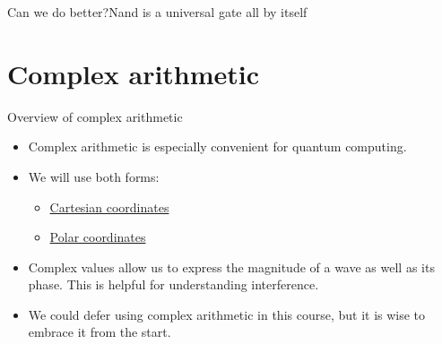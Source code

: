 \begin{frame}{Can we do better?}{Nand is a universal gate all by itself}

\end{frame}

\section{Complex arithmetic}

\begin{frame}{Overview of complex arithmetic}
\begin{itemize}
    \item Complex arithmetic is especially convenient for quantum computing.
    \item We will use both forms:
    \begin{itemize}
        \item \href{https://en.wikipedia.org/wiki/Cartesian_coordinate_system}{Cartesian coordinates}
        \item \href{https://en.wikipedia.org/wiki/Polar_coordinate_system}{Polar coordinates}
    \end{itemize}
    \item Complex values allow us to express the magnitude of a wave as well as its phase.  This is helpful for understanding interference.
    \item We could defer using complex arithmetic in this course, but it is wise to embrace it from the start.
\end{itemize}
\end{frame}

